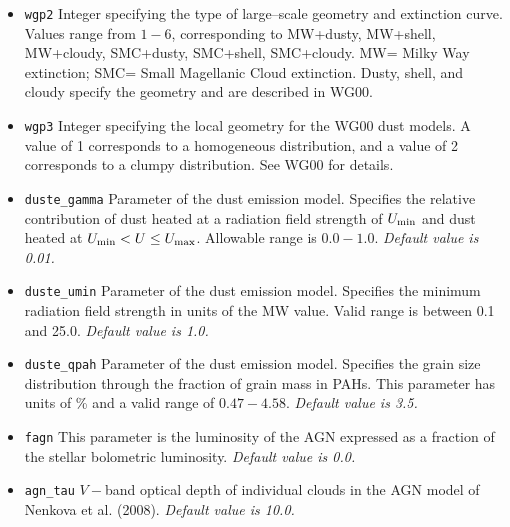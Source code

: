 \documentclass[]{article}
\begin{document}
\begin{itemize}
  $0.25,0.50,0.75,1.00,1.50,2.00,2.50,3.00,3.50,4.00,4.50, 5.00,5.50,6.00,7.00,8.00,9.00,10.0$.
  Note that these optical depths are defined differently from the optical depths
  defined by the parameters \texttt{dust1} and \texttt{dust2}.  See WG00 for
  details.
\item{\texttt{wgp2}} Integer specifying the type of large--scale geometry and
  extinction curve.  Values range from $1-6$, corresponding to MW+dusty,
  MW+shell, MW+cloudy, SMC+dusty, SMC+shell, SMC+cloudy.  MW= Milky Way
  extinction; SMC= Small Magellanic Cloud extinction.  Dusty, shell, and cloudy
  specify the geometry and are described in WG00.
\item{\texttt{wgp3}} Integer specifying the local geometry for the WG00 dust
  models.  A value of 1 corresponds to a homogeneous distribution, and a value
  of 2 corresponds to a clumpy distribution. See WG00 for details.
\item{\texttt{duste\_gamma}} Parameter of the dust emission model.  Specifies
  the relative contribution of dust heated at a radiation field strength of
  $U_{\rm min}$ and dust heated at $U_{\rm min}<U\leq U_{\rm max}$.  Allowable
  range is $0.0-1.0$.
  {\it Default value is 0.01.}
\item{\texttt{duste\_umin}} Parameter of the dust emission model.  Specifies the
  minimum radiation field strength in units of the MW value.  Valid range is
  between 0.1 and 25.0.
  {\it Default value is 1.0.}
\item{\texttt{duste\_qpah}} Parameter of the dust emission model.  Specifies the
  grain size distribution through the fraction of grain mass in PAHs. This
  parameter has units of \% and a valid range of $0.47-4.58$.
  {\it Default value is 3.5.}
\item{\texttt{fagn}} This parameter is the luminosity of the AGN expressed as a
  fraction of the stellar bolometric luminosity.
  {\it Default value is 0.0.}
\item{\texttt{agn\_tau}} $V-$band optical depth of individual clouds in the AGN
  model of Nenkova et al. (2008).
  {\it Default value is 10.0.}
\end{itemize}
\end{document}
